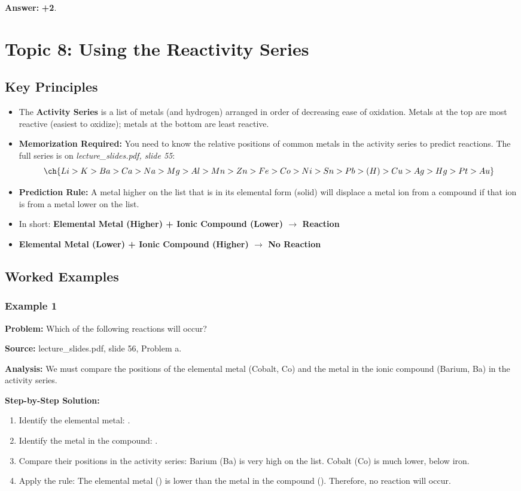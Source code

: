 \documentclass{article}
\begin{document}
\textbf{Answer:} \textbf{+2}.

\section{Topic 8: Using the Reactivity Series}
\subsection{Key Principles}
\begin{itemize}
    \item The \textbf{Activity Series} is a list of metals (and hydrogen) arranged in order of decreasing ease of oxidation. Metals at the top are most reactive (easiest to oxidize); metals at the bottom are least reactive.
    \item \textbf{Memorization Required:} You need to know the relative positions of common metals in the activity series to predict reactions. The full series is on \textit{lecture\_slides.pdf, slide 55}:
    \[ \ch{Li > K > Ba > Ca > Na > Mg > Al > Mn > Zn > Fe > Co > Ni > Sn > Pb > (H) > Cu > Ag > Hg > Pt > Au} \]
    \item \textbf{Prediction Rule:} A metal higher on the list that is in its elemental form (solid) will displace a metal ion from a compound if that ion is from a metal lower on the list.
    \item In short: \textbf{Elemental Metal (Higher) + Ionic Compound (Lower) $\rightarrow$ Reaction}
    \item \textbf{Elemental Metal (Lower) + Ionic Compound (Higher) $\rightarrow$ No Reaction}
\end{itemize}

\subsection{Worked Examples}
\subsubsection{Example 1}
\textbf{Problem:} Which of the following reactions will occur? 

\textbf{Source:} lecture\_slides.pdf, slide 56, Problem a.

\textbf{Analysis:} We must compare the positions of the elemental metal (Cobalt, Co) and the metal in the ionic compound (Barium, Ba) in the activity series.

\textbf{Step-by-Step Solution:}
\begin{enumerate}
    \item Identify the elemental metal: .
    \item Identify the metal in the compound: .
    \item Compare their positions in the activity series: Barium (Ba) is very high on the list. Cobalt (Co) is much lower, below iron.
    \item Apply the rule: The elemental metal () is lower than the metal in the compound (). Therefore, no reaction will occur.
\end{enumerate}
\end{document}
